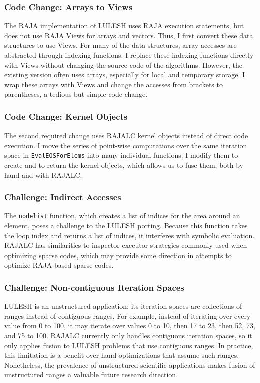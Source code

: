 \subsubsection{Code Change: Arrays to Views}

The RAJA implementation of LULESH uses RAJA execution statements, but
does not use RAJA Views for arrays and vectors. 
Thus, I first convert these data structures to use Views.
For many of the data structures, array accesses are abstracted through
indexing functions. 
I replace these indexing functions directly with Views without changing
the source code of the algorithms.
However, the existing version often uses arrays, especially for local and
temporary storage.
I wrap these arrays with Views and change the accesses from brackets to
parentheses, a tedious but simple code change.

\subsubsection{Code Change: Kernel Objects}

The second required change uses RAJALC kernel objects instead of direct
code execution.
I move the series of point-wise computations over the same iteration space
in \verb.EvalEOSForElems. into many individual functions.
I modify them to create and to return the kernel objects, which allows us
to fuse them, both by hand and with RAJALC.


\subsubsection{Challenge: Indirect Accesses}
The \verb.nodelist. function, which creates a list of indices for the area
around an element, poses a challenge to the LULESH porting.
Because this function takes the loop index and returns a list of indices,
it interferes with symbolic evaluation.
RAJALC has similarities to inspector-executor strategies commonly used when optimizing sparse codes, which may provide some direction in attempts to optimize RAJA-based sparse codes. 

\subsubsection{Challenge: Non-contiguous Iteration Spaces}

LULESH is an unstructured application: its iteration spaces are collections
of ranges instead of contiguous ranges. 
For example, instead of iterating over every value from 0 to 100, it may
iterate over values 0 to 10, then 17 to 23, then 52, 73, and 75 to 100.
RAJALC currently only handles contiguous iteration spaces, so it only
applies fusion to LULESH problems that use contiguous ranges.
In practice, this limitation is a benefit over hand optimizations that assume
such ranges.
Nonetheless, the prevalence of unstructured scientific applications makes
fusion of unstructured ranges a valuable future research direction.


